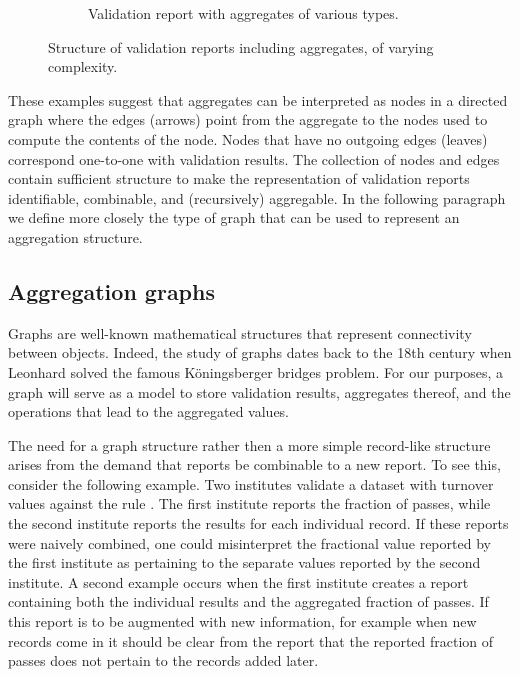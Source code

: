 \begin{figure}[!t]
\begin{subfigure}[b]{0.7\textwidth}
    \caption{Validation report with aggregates of various types.}
    \label{fig:graph3}
  \end{subfigure}
  \caption{Structure of validation reports including aggregates, of varying complexity.}
  \label{fig:graphs}
\end{figure}

These examples suggest that aggregates can be interpreted as nodes in a
directed graph where the edges (arrows) point from the aggregate to the nodes
used to compute the contents of the node. Nodes that have no outgoing edges
(leaves) correspond one-to-one with validation results.  The collection of
nodes and edges contain sufficient structure to make the representation of
validation reports identifiable, combinable, and (recursively) aggregable. In
the following paragraph we define more closely the type of graph that can be
used to represent an aggregation structure.


\subsection{Aggregation graphs}
\label{sect:aggregationgraphs}
Graphs are well-known mathematical structures that represent connectivity
between objects. Indeed, the  study of graphs dates back to the 18th century
when Leonhard \citet{euler1741solutio} solved the famous K\"oningsberger
bridges problem.  For our purposes, a graph will serve as a model to store
validation results, aggregates thereof, and the operations that lead to the
aggregated values.

The need for a graph structure rather then a more simple record-like structure
arises from the demand that reports be combinable to a new report.  To see
this, consider the following example. Two institutes validate a dataset with
turnover values against the rule . The first institute
reports the fraction of passes, while the second institute reports the results
for each individual record. If these reports were naively combined, one could
misinterpret the fractional value reported by the first institute as pertaining
to the separate values reported by the second institute. A second example
occurs when the first institute creates a report containing both the individual
results and the aggregated fraction of passes. If this report is to be
augmented with new information, for example when new records come in it should
be clear from the report that the reported fraction of passes does not pertain
to the records added later.


